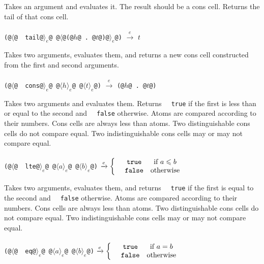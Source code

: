 \documentclass[twocolumn]{report}
\begin{document}
\begin{description}[leftmargin=1.5cm,labelwidth=1.3cm]
\item [\texttt{~~tail}]
Takes an argument and evaluates it.
The result should be a cons cell.
Returns the tail of that cons cell. \\
\\
\texttt{(@$\langle$@~~tail@$\rangle_{e}$@ @$\langle$@(@$h$@ . @$t$@)@$\rangle_{e}$@)} $\xrightarrow{e}$ $t$

\item [\texttt{~~cons}]
Takes two arguments, evaluates them, and returns a new cons cell constructed from the first and second arguments. \\
\\
\texttt{(@$\langle$@~~cons@$\rangle_{e}$@ @$\langle h \rangle_{e}$@ @$\langle t \rangle_{e}$@)} $\xrightarrow{e}$ \texttt{(@$h$@ . @$t$@)}

\item [\texttt{~~lte}]
Takes two arguments and evaluates them.
Returns \texttt{~~true} if the first is less than or equal to the second and \texttt{~~false} otherwise.
Atoms are compared according to their numbers.
Cons cells are always less than atoms.
Two distinguishable cons cells do not compare equal.
Two indistinguishable cons cells may or may not compare equal. \\
\\
\texttt{(@$\langle$@~~lte@$\rangle_{e}$@ @$\langle a \rangle_{e}$@ @$\langle b \rangle_{e}$@)} $\xrightarrow{e} \left\{\begin{matrix} \ \text{\texttt{~~true}} & \textrm{if } a \leqslant b \\ \ \text{\texttt{~~false}} & \textrm{otherwise} \end{matrix}\right.$

\item [\texttt{~~eq}]
Takes two arguments, evaluates them, and returns \texttt{~~true} if the first is equal to the second and \texttt{~~false} otherwise.
Atoms are compared according to their numbers.
Cons cells are always less than atoms.
Two distinguishable cons cells do not compare equal.
Two indistinguishable cons cells may or may not compare equal. \\
\\
\texttt{(@$\langle$@~~eq@$\rangle_{e}$@ @$\langle a \rangle_{e}$@ @$\langle b \rangle_{e}$@)} $\xrightarrow{e} \left\{\begin{matrix} \ \text{\texttt{~~true}} & \textrm{if } a = b \\ \ \text{\texttt{~~false}} & \textrm{otherwise} \end{matrix}\right.$


\end{description}
\end{document}
